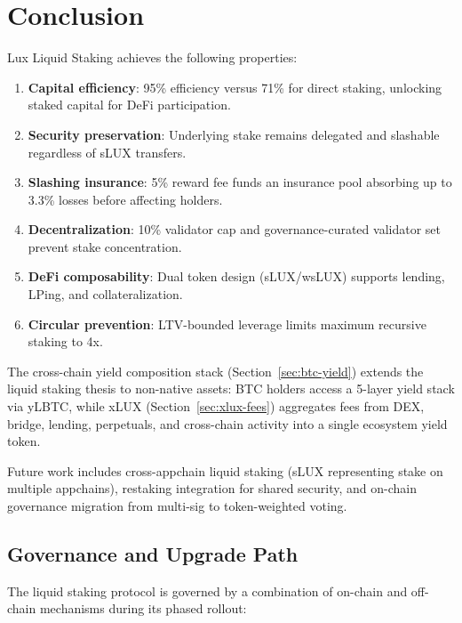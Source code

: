 \section{Conclusion}
\label{sec:conclusion}

Lux Liquid Staking achieves the following properties:

\begin{enumerate}
    \item \textbf{Capital efficiency}: 95\% efficiency versus 71\% for direct staking, unlocking staked capital for DeFi participation.
    \item \textbf{Security preservation}: Underlying stake remains delegated and slashable regardless of sLUX transfers.
    \item \textbf{Slashing insurance}: 5\% reward fee funds an insurance pool absorbing up to 3.3\% losses before affecting holders.
    \item \textbf{Decentralization}: 10\% validator cap and governance-curated validator set prevent stake concentration.
    \item \textbf{DeFi composability}: Dual token design (sLUX/wsLUX) supports lending, LPing, and collateralization.
    \item \textbf{Circular prevention}: LTV-bounded leverage limits maximum recursive staking to 4x.
\end{enumerate}

The cross-chain yield composition stack (Section~\ref{sec:btc-yield}) extends the liquid staking thesis to non-native assets: BTC holders access a 5-layer yield stack via yLBTC, while xLUX (Section~\ref{sec:xlux-fees}) aggregates fees from DEX, bridge, lending, perpetuals, and cross-chain activity into a single ecosystem yield token.

Future work includes cross-appchain liquid staking (sLUX representing stake on multiple appchains), restaking integration for shared security, and on-chain governance migration from multi-sig to token-weighted voting.

\subsection{Governance and Upgrade Path}

The liquid staking protocol is governed by a combination of on-chain and off-chain mechanisms during its phased rollout:

